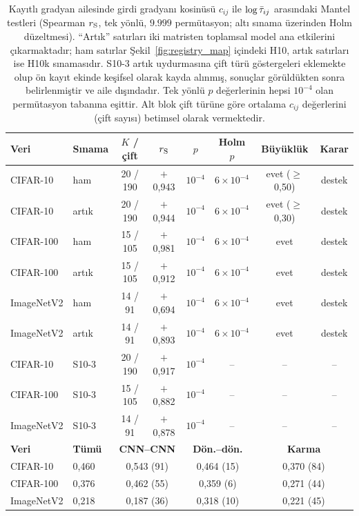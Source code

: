 \begin{table}[!t]
\centering
\caption{Kayıtlı gradyan ailesinde girdi gradyanı kosinüsü $c_{ij}$ ile $\log\bar{\tau}_{ij}$ arasındaki Mantel testleri (Spearman $r_{\mathrm{S}}$, tek yönlü, $9.999$ permütasyon; altı sınama üzerinden Holm düzeltmesi). ``Artık'' satırları iki matristen toplamsal model ana etkilerini çıkarmaktadır; ham satırlar Şekil~\ref{fig:registry_map} içindeki H10, artık satırları ise H10k sınamasıdır. S10-3 artık uydurmasına çift türü göstergeleri eklemekte olup ön kayıt ekinde keşifsel olarak kayda alınmış, sonuçlar görüldükten sonra belirlenmiştir ve aile dışındadır. Tek yönlü $p$ değerlerinin hepsi $10^{-4}$ olan permütasyon tabanına eşittir. Alt blok çift türüne göre ortalama $c_{ij}$ değerlerini (çift sayısı) betimsel olarak vermektedir.}
\label{tab:mantel}
\scriptsize
\setlength{\tabcolsep}{1.5pt}
\begin{tabular}{llcccccc}
\toprule
\textbf{Veri} & \textbf{Sınama} & \textbf{$K$ / çift} & \textbf{$r_{\mathrm{S}}$} & \textbf{$p$} & \textbf{Holm $p$} & \textbf{Büyüklük} & \textbf{Karar} \\
\midrule
CIFAR-10 & ham & 20 / 190 & $+$0,943 & $10^{-4}$ & $6\times10^{-4}$ & evet ($\geq$0,50) & destek \\
CIFAR-10 & artık & 20 / 190 & $+$0,944 & $10^{-4}$ & $6\times10^{-4}$ & evet ($\geq$0,30) & destek \\
CIFAR-100 & ham & 15 / 105 & $+$0,981 & $10^{-4}$ & $6\times10^{-4}$ & evet & destek \\
CIFAR-100 & artık & 15 / 105 & $+$0,912 & $10^{-4}$ & $6\times10^{-4}$ & evet & destek \\
ImageNetV2 & ham & 14 / 91 & $+$0,694 & $10^{-4}$ & $6\times10^{-4}$ & evet & destek \\
ImageNetV2 & artık & 14 / 91 & $+$0,893 & $10^{-4}$ & $6\times10^{-4}$ & evet & destek \\
CIFAR-10 & S10-3 & 20 / 190 & $+$0,917 & $10^{-4}$ & -- & -- & -- \\
CIFAR-100 & S10-3 & 15 / 105 & $+$0,882 & $10^{-4}$ & -- & -- & -- \\
ImageNetV2 & S10-3 & 14 / 91 & $+$0,878 & $10^{-4}$ & -- & -- & -- \\
\midrule
\textbf{Veri} & \textbf{Tümü} & \multicolumn{2}{c}{\textbf{CNN--CNN}} & \multicolumn{2}{c}{\textbf{Dön.--dön.}} & \multicolumn{2}{c}{\textbf{Karma}} \\
\midrule
CIFAR-10 & 0,460 & \multicolumn{2}{c}{0,543 (91)} & \multicolumn{2}{c}{0,464 (15)} & \multicolumn{2}{c}{0,370 (84)} \\
CIFAR-100 & 0,376 & \multicolumn{2}{c}{0,462 (55)} & \multicolumn{2}{c}{0,359 (6)} & \multicolumn{2}{c}{0,271 (44)} \\
ImageNetV2 & 0,218 & \multicolumn{2}{c}{0,187 (36)} & \multicolumn{2}{c}{0,318 (10)} & \multicolumn{2}{c}{0,221 (45)} \\
\bottomrule
\end{tabular}
\end{table}

